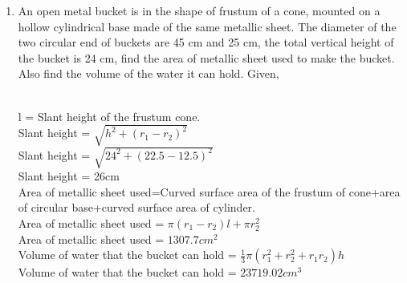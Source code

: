 \documentclass[journal,12pt,twocolumn]{IEEEtran}
\renewcommand\thesection{\arabic{section}}
\begin{document}
\begin{enumerate}[label=\thesection.\arabic*.,ref=\thesection.\theenumi]
\item An open metal bucket is in the shape of frustum of a cone, mounted on a hollow cylindrical base made of the same metallic sheet. The diameter of the two circular end of buckets are 45 cm and 25 cm, the total vertical height of the bucket is 24 cm, find the area of metallic sheet used to make the bucket. Also find the volume of the water it can hold.
\solution Given, \\
\begin{table}[ht]
 \centering
 \caption{}
 \end{table} \\ 
 l = Slant height of the frustum cone. \\
 
 Slant height =  $\sqrt {h^2 +(r_1-r_2)^2}$ \\
 Slant height =  $\sqrt {24^2 +(22.5-12.5)^2}$ \\
 Slant height = 26cm\\
 
Area of metallic sheet used=Curved surface area of the frustum of cone+area of circular base+curved surface area of cylinder. \\

Area of metallic sheet used = $\pi(r_1-r_2)l+\pi r_2^2$\\
Area of metallic sheet used = $1307.7 cm^2$\\

Volume of water that the bucket can hold = $\frac{1}{3} \pi(r_1^2 + r_2^2 + r_1r_2)h$\\

Volume of water that the bucket can hold  = $23719.02cm^3$ \\


\end{enumerate}
\end{document}

